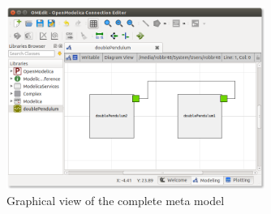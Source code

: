 \begin{figure}[ht]
\centering
\includegraphics[width=0.75\textwidth]{figs/metamodel.png}
\caption{Graphical view of the complete meta model}
\label{fig:metamodel_omedit}
\end{figure}